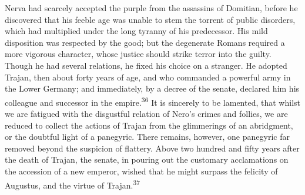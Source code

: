 

Nerva had scarcely accepted the purple from the assassins of
Domitian, before he discovered that his feeble age was unable to
stem the torrent of public disorders, which had multiplied under
the long tyranny of his predecessor. His mild disposition was
respected by the good; but the degenerate Romans required a more
vigorous character, whose justice should strike terror into the
guilty. Though he had several relations, he fixed his choice on a
stranger. He adopted Trajan, then about forty years of age, and
who commanded a powerful army in the Lower Germany; and
immediately, by a decree of the senate, declared him his
colleague and successor in the empire.\textsuperscript{36} It is sincerely to be
lamented, that whilst we are fatigued with the disgustful
relation of Nero’s crimes and follies, we are reduced to collect
the actions of Trajan from the glimmerings of an abridgment, or
the doubtful light of a panegyric. There remains, however, one
panegyric far removed beyond the suspicion of flattery. Above two
hundred and fifty years after the death of Trajan, the senate, in
pouring out the customary acclamations on the accession of a new
emperor, wished that he might surpass the felicity of Augustus,
and the virtue of Trajan.\textsuperscript{37}



